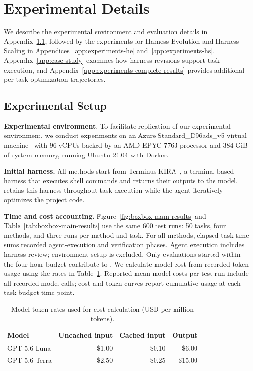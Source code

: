 \section{Experimental Details}
\label{app:experiments}

We describe the experimental environment and evaluation details in Appendix~\ref{app:experiments-config}, followed by the experiments for Harness Evolution and Harness Scaling in Appendices~\ref{app:experiments-he} and~\ref{app:experiments-hs}. Appendix~\ref{app:case-study} examines how \boxbox{} harness revisions support task execution, and Appendix~\ref{app:experiments-complete-results} provides additional per-task optimization trajectories.

\subsection{Experimental Setup}
\label{app:experiments-config}

\textbf{Experimental environment.}
To facilitate replication of our experimental environment, we conduct
experiments on an Azure Standard\_D96ads\_v5 virtual machine~\citep{microsoft2026dadsv5}
with 96 vCPUs backed by an AMD EPYC 7763 processor and 384 GiB of system memory,
running Ubuntu 24.04 with Docker.

\textbf{Initial harness.}
All methods start from Terminus-KIRA~\citep{terminuskira2026}, a terminal-based harness that executes
shell commands and returns their outputs to the model. \frozen{} retains
this harness throughout task execution while the agent iteratively optimizes
the project code.

\textbf{Time and cost accounting.}
Figure~\ref{fig:boxbox-main-results} and Table~\ref{tab:boxbox-main-results}
use the same 600 test runs: 50 tasks, four methods, and three runs per
method and task.
For all methods, elapsed task time sums recorded agent-execution and verification phases.
Agent execution includes harness review; environment setup is excluded.
Only evaluations started within the four-hour budget contribute to
.
We calculate model cost from recorded token usage using the rates in
Table~\ref{tab:model-token-costs}.
Reported mean model costs per test run include all recorded model calls; cost and token
curves report cumulative usage at each task-budget time point.

\begin{table}[H]
  \centering
  \small
  \caption{Model token rates used for cost calculation (USD per million tokens).}
  \label{tab:model-token-costs}
  \begin{tabular}{lrrr}
    \toprule
    Model & Uncached input & Cached input & Output \\
    \midrule
    GPT-5.6-Luna & \$1.00 & \$0.10 & \$6.00 \\
    GPT-5.6-Terra & \$2.50 & \$0.25 & \$15.00 \\
    \bottomrule
  \end{tabular}
\end{table}

